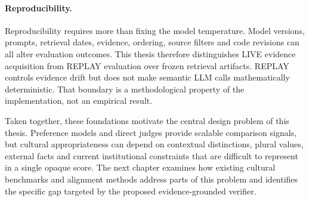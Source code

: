 \paragraph{Reproducibility.} Reproducibility requires more than fixing the model temperature. Model versions, prompts, retrieval dates, evidence, ordering, source filters and code revisions can all alter evaluation outcomes. This thesis therefore distinguishes LIVE evidence acquisition from REPLAY evaluation over frozen retrieval artifacts. REPLAY controls evidence drift but does not make semantic LLM calls mathematically deterministic. That boundary is a methodological property of the implementation, not an empirical result.

Taken together, these foundations motivate the central design problem of this thesis. Preference models and direct judges provide scalable comparison signals, but cultural appropriateness can depend on contextual distinctions, plural values, external facts and current institutional constraints that are difficult to represent in a single opaque score. The next chapter examines how existing cultural benchmarks and alignment methods address parts of this problem and identifies the specific gap targeted by the proposed evidence-grounded verifier.
